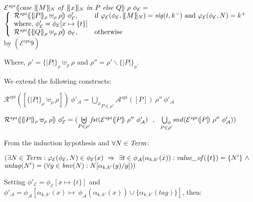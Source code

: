 \documentclass[10pt,a4paper,final,oneside,fleqn]{book}
\begin{document}
\noindent
$\mathcal{E}^{spi}(\![\mbox{{\itshape case\/} }[\!\{M\}\!]_N\mbox{ {\itshape of\/} }[\!\{x\}\!]_N\mbox{ {\itshape in\/} }P\mbox{ {\itshape else\/} }Q]\!)~\rho~\phi_\mathcal{E}=$\\
$\left\{\begin{array}{ll} \mathcal{R}^{spi}(\![\{\!|P|\!\}_\rho\uplus_\rho\rho]\!)~\phi'_\mathcal{E},&\mbox{if }\varphi_\mathcal{E}(\phi_\mathcal{E},[\!\{M\}\!]_N)=\mbox{{\itshape sig\/}}(t,k^-)\mbox{ and }\varphi_\mathcal{E}(\phi_\mathcal{E},N)=k^+\\
\mbox{where, }\phi'_\mathcal{E}=\phi_\mathcal{E}[x\mapsto\{t\}]&\\
\mathcal{R}^{spi}(\![\{\!|Q|\!\}_\rho\uplus_\rho\rho]\!)~\phi_\mathcal{E},&\mbox{otherwise}\\
\end{array}\right.$\!\!\!\!\!\hfill by $(\mathcal{E}^{spi} 9)$\vspace{5mm}

\noindent
Where, $\rho'=\{\!|P|\!\}_\rho\uplus_\rho\rho$ and $\rho''=\rho'\backslash\{\!|P|\!\}_\rho$.\vspace{5mm}

\noindent
We extend the following constructs:

\noindent
$\mathcal{R}^{spi}(\![\{\!|P|\!\}_\rho\uplus_\rho\rho]\!)~\phi'_\mathcal{A}=\underset{P\in\rho'}{\bigcup_\phi}\mathcal{A}^{spi}(\![P]\!)~\rho''~\phi'_\mathcal{A}$

\noindent
$\mathcal{R}^{spi}(\![\{\!|P|\!\}_\rho\uplus_\rho\rho]\!)~\phi'_\mathcal{E}=(\underset{P\in\rho'}{\biguplus}\mbox{{\itshape fst\/}}(\mathcal{E}^{spi}(\![P]\!)~\rho''~\phi'_\mathcal{A})~~,~~\underset{P\in\rho'}{\bigcup_\phi}\mbox{{\itshape snd\/}}(\mathcal{E}^{spi}(\![P]\!)~\rho''~\phi'_\mathcal{A}))$\vspace{5mm}

\noindent
From the induction hypothesis and $\forall N\in\mbox{{\itshape Term\/}}$:

\noindent
$(\exists N\in\mbox{{\itshape Term\/}}:\varphi_\mathcal{E}(\phi_\mathcal{E},N)\in\phi_\mathcal{E}(x)~\Rightarrow~\exists t\in\phi_\mathcal{A}(\alpha_{k,k'}(x)):\mbox{{\itshape value\_of\/}}(\{t\})=\{N'\}~\wedge$\\
$\mbox{{\itshape untag\/}}(N')=(\forall y\in\mbox{{\itshape bnv\/}}(N):N[\alpha_{k,k'}(y)/y]))$\vspace{5mm}

\noindent
Setting $\phi'_\mathcal{E}=\phi_\mathcal{E}[x\mapsto\{t\}]$ and $\phi'_\mathcal{A}=\phi_\mathcal{A}[\alpha_{k,k'}(x)\mapsto~\phi_\mathcal{A}(\alpha_{k,k'}(x))\cup\{\alpha_{k,k'}({tag})\}]$, then:
\end{document}
